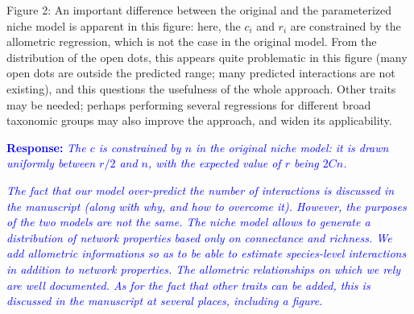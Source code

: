 \documentclass [12pt,onecolumn,twoside,openright]{report}
\begin{document}
\begin{onehalfspacing}
\medskip Figure 2: An important difference between the original and the
parameterized niche model is apparent in this figure: here, the $c_i$ and $r_i$
are constrained by the allometric regression, which is not the case in the
original model. From the distribution of the open dots, this appears quite
problematic in this figure (many open dots are outside the predicted range; many
predicted interactions are not existing), and this questions the usefulness of
the whole approach. Other traits may be needed; perhaps performing several
regressions for different broad taxonomic groups may also improve the approach,
and widen its applicability.

\medskip\textcolor{blue}{\textbf{Response:}} \textit{\textcolor{blue}{The $c$ is
constrained by $n$ in the original niche model: it is drawn uniformly
between $r/2$ and $n$, with the expected value of $r$ being $2Cn$.}}

\medskip\textit{\textcolor{blue}{The fact that our model over-predict the number of
interactions is discussed in the manuscript (along with why, and how to overcome
it). However, the purposes of the two models are not the same. The niche model
allows to generate a distribution of network properties based only on
connectance and richness. We add allometric informations so as to be able to
estimate species-level interactions in addition to network properties. The
allometric relationships on which we rely are well documented. As for the fact
that other traits can be added, this is discussed in the manuscript at several
places, including a figure. }}

\newpage
 \printbibliography


\end{onehalfspacing}
\end{document}
